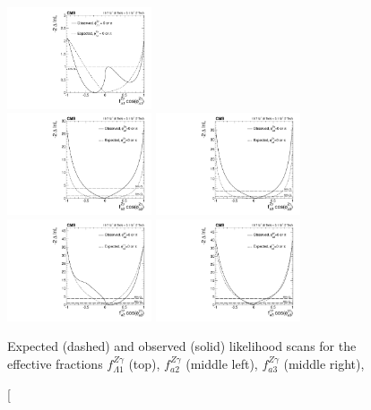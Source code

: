\begin{figure}
\centering
	\includegraphics[width=0.38\textwidth,angle=0]{Spin_Parity/ZGamma_fL1.pdf} \\
	\includegraphics[width=0.38\textwidth,angle=0]{Spin_Parity/ZGamma_fa2.pdf}
	\includegraphics[width=0.38\textwidth,angle=0]{Spin_Parity/ZGamma_fa3.pdf} \\
	\includegraphics[width=0.38\textwidth,angle=0]{Spin_Parity/GammaGamma_fa2.pdf}
	\includegraphics[width=0.38\textwidth,angle=0]{Spin_Parity/GammaGamma_fa3.pdf}
	\caption[Expected (dashed) and observed (solid)  likelihood scans for the effective fractions
	$f_{\Lambda1}^{Z\gamma}$ (top), $f_{a2}^{Z\gamma}$ (middle left), $f_{a3}^{Z\gamma}$ (middle right),

\end{figure}
